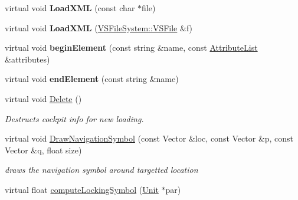 \begin{DoxyCompactItemize}
\item 
virtual void {\bfseries Load\+X\+ML} (const char $\ast$file)\hypertarget{classCockpit_a877ed59b9c05666ddd871aeda2d949fc}{}\label{classCockpit_a877ed59b9c05666ddd871aeda2d949fc}

\item 
virtual void {\bfseries Load\+X\+ML} (\hyperlink{classVSFileSystem_1_1VSFile}{V\+S\+File\+System\+::\+V\+S\+File} \&f)\hypertarget{classCockpit_a27e78520c916d5fa1e0c4decb0a09bb6}{}\label{classCockpit_a27e78520c916d5fa1e0c4decb0a09bb6}

\item 
virtual void {\bfseries begin\+Element} (const string \&name, const \hyperlink{classXMLSupport_1_1AttributeList}{Attribute\+List} \&attributes)\hypertarget{classCockpit_ab718a4367e3e5e23c16b8bddae04cdb2}{}\label{classCockpit_ab718a4367e3e5e23c16b8bddae04cdb2}

\item 
virtual void {\bfseries end\+Element} (const string \&name)\hypertarget{classCockpit_a1e752e7e85dd42123c10452ba5f99a8a}{}\label{classCockpit_a1e752e7e85dd42123c10452ba5f99a8a}

\item 
virtual void \hyperlink{classCockpit_a4315ca8cdf10b2a20a8768b35bf963f3}{Delete} ()\hypertarget{classCockpit_a4315ca8cdf10b2a20a8768b35bf963f3}{}\label{classCockpit_a4315ca8cdf10b2a20a8768b35bf963f3}

\begin{DoxyCompactList}\small\item\em Destructs cockpit info for new loading. \end{DoxyCompactList}\item 
virtual void \hyperlink{classCockpit_a172ebf9a8d38f44b252bd23f0aa89106}{Draw\+Navigation\+Symbol} (const Vector \&loc, const Vector \&p, const Vector \&q, float size)\hypertarget{classCockpit_a172ebf9a8d38f44b252bd23f0aa89106}{}\label{classCockpit_a172ebf9a8d38f44b252bd23f0aa89106}

\begin{DoxyCompactList}\small\item\em draws the navigation symbol around targetted location \end{DoxyCompactList}\item 
virtual float \hyperlink{classCockpit_afa51d54ed020eb6dc757c5daa461cc3e}{compute\+Locking\+Symbol} (\hyperlink{classUnit}{Unit} $\ast$par)\hypertarget{classCockpit_afa51d54ed020eb6dc757c5daa461cc3e}{}\label{classCockpit_afa51d54ed020eb6dc757c5daa461cc3e}


\end{DoxyCompactItemize}
